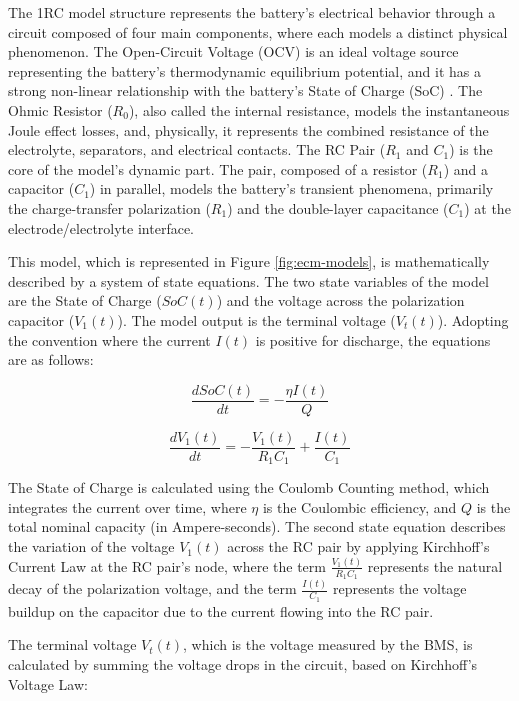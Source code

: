 \documentclass[lettersize,journal]{IEEEtran}
\begin{document}
The 1RC model structure represents the battery's electrical behavior through a circuit composed of four main components, where each models a distinct physical phenomenon. The Open-Circuit Voltage (OCV) is an ideal voltage source representing the battery's thermodynamic equilibrium potential, and it has a strong non-linear relationship with the battery's State of Charge (SoC) \cite{tran2021comprehensive}. The Ohmic Resistor ($R_0$), also called the internal resistance, models the instantaneous Joule effect losses, and, physically, it represents the combined resistance of the electrolyte, separators, and electrical contacts. The RC Pair ($R_1$ and $C_1$) is the core of the model's dynamic part. The pair, composed of a resistor ($R_1$) and a capacitor ($C_1$) in parallel, models the battery's transient phenomena, primarily the charge-transfer polarization ($R_1$) and the double-layer capacitance ($C_1$) at the electrode/electrolyte interface.

This model, which is represented in Figure \ref{fig:ecm-models}, is mathematically described by a system of state equations. The two state variables of the model are the State of Charge ($SoC(t)$) and the voltage across the polarization capacitor ($V_1(t)$). The model output is the terminal voltage ($V_t(t)$). Adopting the convention where the current $I(t)$ is positive for discharge, the equations are as follows:

\begin{equation}
	\label{eq:soc}
	\frac{dSoC(t)}{dt} = - \frac{\eta I(t)}{Q}
\end{equation}

\begin{equation}
	\label{eq:v1}
	\frac{dV_1(t)}{dt} = - \frac{V_1(t)}{R_1 C_1} + \frac{I(t)}{C_1}
\end{equation}

The State of Charge is calculated using the Coulomb Counting method, which integrates the current over time, where $\eta$ is the Coulombic efficiency, and $Q$ is the total nominal capacity (in Ampere-seconds)\cite{xie2023state}. The second state equation describes the variation of the voltage $V_1(t)$ across the RC pair by applying Kirchhoff's Current Law at the RC pair's node, where the term $\frac{V_1(t)}{R_1 C_1}$ represents the natural decay of the polarization voltage, and the term $\frac{I(t)}{C_1}$ represents the voltage buildup on the capacitor due to the current flowing into the RC pair.

The terminal voltage $V_t(t)$, which is the voltage measured by the BMS, is calculated by summing the voltage drops in the circuit, based on Kirchhoff's Voltage Law:
\end{document}
